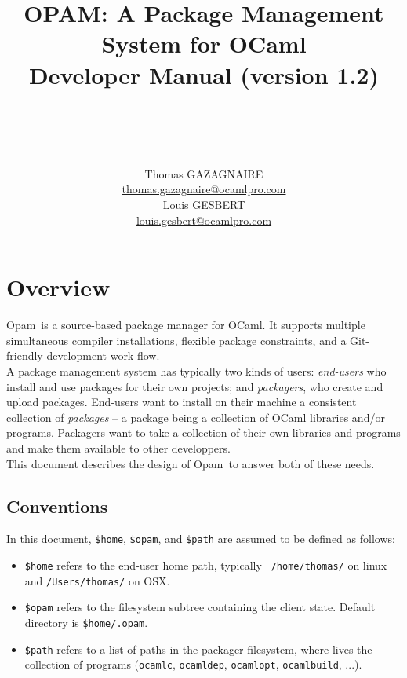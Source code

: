 \documentclass[a4paper,10pt]{article}
\title{
OPAM: A Package Management System for OCaml\\
Developer Manual (version 1.2)\\ ~\ \\
~\ \\}
\author{Thomas GAZAGNAIRE\\
\url{thomas.gazagnaire@ocamlpro.com}\\
Louis GESBERT\\
\url{louis.gesbert@ocamlpro.com}\\
}
\begin{document}
\newcommand{\OPAM}{{\sc Opam}}

\maketitle

\vfill

\tableofcontents

\section*{Overview}

\OPAM\ is a source-based package manager for OCaml. It supports multiple
simultaneous compiler installations, flexible package constraints, and
a Git-friendly development work-flow.\\

A package management system has typically two kinds of users: {\em
  end-users} who install and use packages for their own projects; and
{\em packagers}, who create and upload packages. End-users want to
install on their machine a consistent collection of {\em packages} --
a package being a collection of OCaml libraries and/or programs.
Packagers want to take a collection of their own libraries and
programs and make them available to other developpers.\\

This document describes the design of \OPAM\ to answer both of these needs.

\subsection*{Conventions}

In this document, \verb+$home+, \verb+$opam+, and
\verb+$path+ are assumed to be defined as follows:

\begin{itemize}

\item {\tt \$home} refers to the end-user home path, typically {\tt
  /home/thomas/} on linux and {\tt /Users/thomas/} on OSX.

\item {\tt \$opam} refers to the filesystem subtree containing the
  client state. Default directory is {\tt \$home/.opam}.

\item {\tt \$path} refers to a list of paths in the packager filesystem, where
  lives the collection of programs ({\tt ocamlc}, {\tt ocamldep}, {\tt ocamlopt},
  {\tt ocamlbuild}, ...).

\end{itemize}
\end{document}
